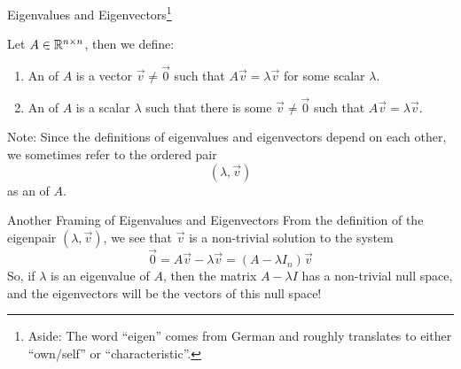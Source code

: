 \documentclass[xcoler=dvipsnames, aspectratio=169]{beamer}
\date{Eigenvalues and Eigenvectors}
\begin{document}
    \begin{frame}{Eigenvalues and Eigenvectors\footnote{Aside: The word ``eigen'' comes from 
        German and roughly translates to either ``own/self'' or ``characteristic''.}}
        \begin{defn}
            Let $A\in\mathbb{R}^{n\times n}$, then we define:
            \begin{enumerate}
                \pause\item An  of $A$ is a vector $\vec{v}\neq\vec{0}$ such that
                    $A\vec{v} = \lambda\vec{v}$ for some scalar $\lambda$.
                \pause\item An  of $A$ is a scalar $\lambda$ such that there is
                    some $\vec{v}\neq\vec{0}$ such that $A\vec{v} = \lambda\vec{v}$.
            \end{enumerate}
        \end{defn}\pause
        \begin{tcolorbox}
            Note: Since the definitions of eigenvalues and eigenvectors depend on each other, we sometimes
            refer to the ordered pair
            \[
                (\lambda,\vec{v})
            \]
            as an  of $A$.
        \end{tcolorbox}
    \end{frame}
    \begin{frame}{Another Framing of Eigenvalues and Eigenvectors}
        From the definition of the eigenpair $(\lambda,\vec{v})$, we see that $\vec{v}$ is a non-trivial
        solution to the system
        \[
            \vec{0} = A\vec{v} - \lambda\vec{v} = (A-\lambda I_n)\vec{v}
        \]\pause
        So, if $\lambda$ is an eigenvalue of $A$, then the matrix $A-\lambda I$ has a non-trivial
        null space, and the eigenvectors will be the vectors of this null space!
    \end{frame}
\end{document}
